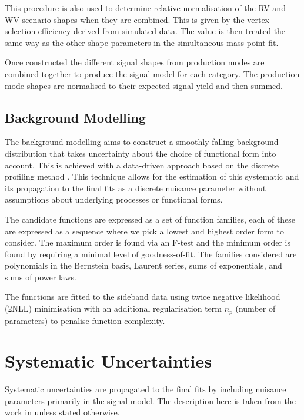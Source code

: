 This procedure is also used to determine relative normalisation of the RV and WV scenario shapes when they are combined. 
This is given by the vertex selection efficiency derived from simulated data. 
The value is then treated the same way as the other shape parameters in the simultaneous mass point fit. 

Once constructed the different signal shapes from production modes are combined together to produce the signal model for each category. 
The production mode shapes are normalised to their expected signal yield and then summed.



\subsection{Background Modelling}
The background modelling aims to construct a smoothly falling background distribution that takes uncertainty about the choice of functional form into account. This is achieved with a data-driven approach based on the discrete profiling method \cite{env_method}. This technique allows for the estimation of this systematic and its propagation to the final fits as a discrete nuisance parameter without assumptions about underlying processes or functional forms. 

The candidate functions are expressed as a set of function families, each of these are expressed as a sequence where we pick a lowest and highest order form to consider. The maximum order is found via an F-test \cite{FTest} and the minimum order is found by requiring a minimal level of goodness-of-fit. 
The families considered are polynomials in the Bernstein basis, Laurent series, sums of exponentials, and sums of power laws. 

The functions are fitted to the \mgg sideband data using twice negative likelihood (2NLL) minimisation with an additional regularisation term $n_p$ (number of parameters) to penalise function complexity. 



\section{Systematic Uncertainties}
Systematic uncertainties are propagated to the final fits by including nuisance parameters primarily in the signal model. 
The description here is taken from the work in \cite{HIG-16-040} unless stated otherwise. 

